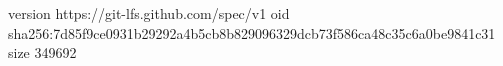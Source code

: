 version https://git-lfs.github.com/spec/v1
oid sha256:7d85f9ce0931b29292a4b5cb8b829096329dcb73f586ca48c35c6a0be9841c31
size 349692
